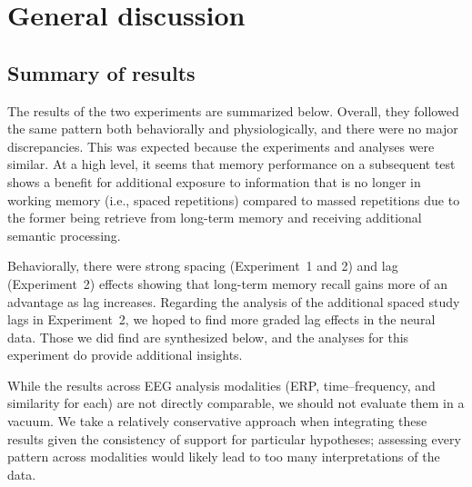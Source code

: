 
\chapter{General discussion}





\section{Summary of results}


The results of the two experiments are summarized below.  Overall, they followed the same pattern both behaviorally and physiologically, and there were no major discrepancies.  This was expected because the experiments and analyses were similar.  At a high level, it seems that memory performance on a subsequent test shows a benefit for additional exposure to information that is no longer in working memory (i.e., spaced repetitions) compared to massed repetitions due to the former being retrieve from long-term memory and receiving additional semantic processing.

Behaviorally, there were strong spacing (Experiment~1 and 2) and lag (Experiment~2) effects showing that long-term memory recall gains more of an advantage as lag increases.
Regarding the analysis of the additional spaced study lags in Experiment~2, we hoped to find more graded lag effects in the neural data.  Those we did find are synthesized below, and the analyses for this experiment do provide additional insights.

While the results across EEG analysis modalities (ERP, time--frequency, and similarity for each) are not directly comparable, we should not evaluate them in a vacuum.  We take a relatively conservative approach when integrating these results given the consistency of support for particular hypotheses; assessing every pattern across modalities would likely lead to too many interpretations of the data.



